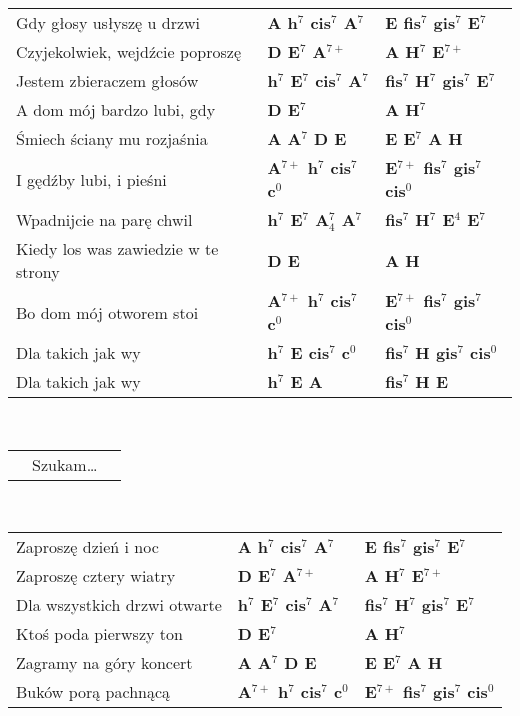 {\begin{tabular}{@{}p{60mm}@{}p{30mm}|l}
Gdy głosy usłyszę u drzwi & {\bfseries A h$^7$ cis$^7$ A$^7$ } & {\bfseries E fis$^7$ gis$^7$ E$^7$} \\
Czyjekolwiek, wejdźcie poproszę & {\bfseries D E$^7$ A$^{7+}$ } & {\bfseries A H$^7$ E$^{7+}$} \\
Jestem zbieraczem głosów & {\bfseries h$^7$ E$^7$ cis$^7$ A$^7$ } & {\bfseries fis$^7$ H$^7$ gis$^7$ E$^7$}  \\
A dom mój bardzo lubi, gdy & {\bfseries D E$^7$ } & {\bfseries A H$^7$}\\
Śmiech ściany mu rozjaśnia & {\bfseries A A$^7$ D E } & {\bfseries E E$^7$ A H} \\
I gędźby lubi, i pieśni & {\bfseries A$^{7+}$ h$^7$ cis$^7$ c$^0$ }  & {\bfseries E$^{7+}$ fis$^7$ gis$^7$ cis$^0$} \\
Wpadnijcie na parę chwil & {\bfseries h$^7$ E$^7$ A$^{7}_{4}$ A$^7$ }  & {\bfseries fis$^7$ H$^7$ E$^4$ E$^7$}\\
Kiedy los was zawiedzie w te strony & {\bfseries D E } & {\bfseries A H }  \\
Bo dom mój otworem stoi & {\bfseries A$^{7+}$ h$^7$ cis$^7$ c$^0$ } & {\bfseries E$^{7+}$ fis$^7$ gis$^7$ cis$^0$} \\
Dla takich jak wy & {\bfseries h$^7$ E cis$^7$ c$^0$ } & {\bfseries fis$^7$ H gis$^7$ cis$^0$}\\
Dla takich jak wy & {\bfseries h$^7$ E A } & {\bfseries fis$^7$ H E} \\
\end{tabular}
\\[1.0mm]
\begin{tabular}{@{}p{5mm}@{}p{93mm}l} 
& Szukam\ldots \\
\end{tabular}
\\[1.0mm]
\begin{tabular}{@{}p{60mm}@{}p{30mm}|l} 
Zaproszę dzień i noc & {\bfseries A h$^7$ cis$^7$ A$^7$ } & {\bfseries E fis$^7$ gis$^7$ E$^7$}\\
Zaproszę cztery wiatry & {\bfseries D E$^7$ A$^{7+}$ }  & {\bfseries A H$^7$ E$^{7+}$}\\
Dla wszystkich drzwi otwarte & {\bfseries h$^7$ E$^7$ cis$^7$ A$^7$ }  & {\bfseries fis$^7$ H$^7$ gis$^7$ E$^7$} \\
Ktoś poda pierwszy ton & {\bfseries D E$^7$ } & {\bfseries A H$^7$}\\
Zagramy na góry koncert & {\bfseries A A$^7$ D E } & {\bfseries E E$^7$ A H} \\
Buków porą pachnącą  & {\bfseries A$^{7+}$ h$^7$ cis$^7$ c$^0$ }  & {\bfseries E$^{7+}$ fis$^7$ gis$^7$ cis$^0$}\\

\end{tabular}}
